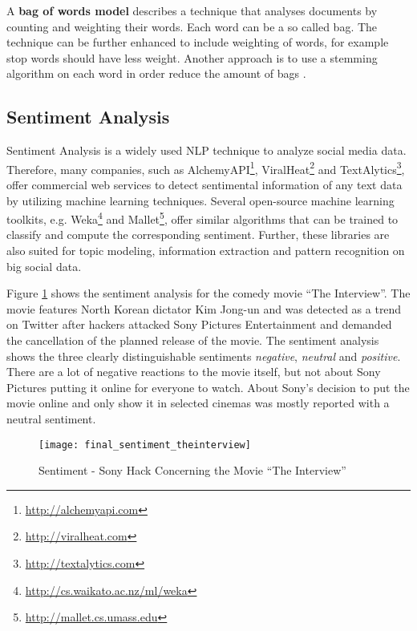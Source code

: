 A \textbf{bag of words model} describes a technique that analyses documents by counting and weighting their words. Each word can be a so called bag. The technique can be further enhanced to include weighting of words, for example stop words should have less weight. Another approach is to use a stemming algorithm on each word in order reduce the amount of bags \cite[117]{manning2008introduction}.


\subsection{Sentiment Analysis}
\label{subsec:sentiment-analysis}
Sentiment Analysis is a widely used NLP technique to analyze social media data. Therefore, many companies, such as AlchemyAPI\footnote{\url{http://alchemyapi.com} \accessednote}, ViralHeat\footnote{\url{http://viralheat.com} \accessednote} and TextAlytics\footnote{\url{http://textalytics.com} \accessednote}, offer commercial web services to detect sentimental information of any text data by utilizing machine learning techniques. Several open-source machine learning toolkits, e.g. Weka\footnote{\url{http://cs.waikato.ac.nz/ml/weka} \accessednote} and Mallet\footnote{\url{http://mallet.cs.umass.edu} \accessednote}, offer similar algorithms that can be trained to classify and compute the corresponding sentiment. Further, these libraries are also suited for topic modeling, information extraction and pattern recognition on big social data.

Figure \ref{fig:sentiment-interview} shows the sentiment analysis for the comedy movie \enquote{The Interview}. The movie features North Korean dictator Kim Jong-un and was detected as a trend on Twitter after hackers attacked Sony Pictures Entertainment and demanded the cancellation of the planned release of the movie. The sentiment analysis shows the three clearly distinguishable sentiments \textit{negative}, \textit{neutral} and \textit{positive}. There are a lot of negative reactions to the movie itself, but not about Sony Pictures putting it online for everyone to watch. About Sony's decision to put the movie online and only show it in selected cinemas was mostly reported with a neutral sentiment.

\begin{figure}[H]
  \centering
        \texttt{[image: final\_sentiment\_theinterview]}
  \caption[Sentiment - Sony Hack Concerning the Movie \enquote{The Interview}]{Sentiment - Sony Hack Concerning the Movie \enquote{The Interview}}
  \label{fig:sentiment-interview}
  \vspace{-1.3em}
\end{figure}

